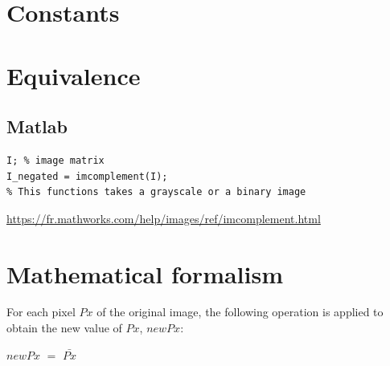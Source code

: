 \documentclass[12pt,a4paper]{article}
\begin{document}
\section*{Constants}




\section*{Equivalence}
\subsection*{Matlab}

\lstset{language=Matlab}
\begin{lstlisting}
I; % image matrix
I_negated = imcomplement(I);
% This functions takes a grayscale or a binary image

\end{lstlisting}

\url{https://fr.mathworks.com/help/images/ref/imcomplement.html}



\section*{Mathematical formalism}

For each pixel $Px$ of the original image, the following operation is applied to obtain the new value of $Px$, $newPx$:


\centering

$\displaystyle newPx $ 	$\textstyle =$ 	$\displaystyle \bar{Px}$

\vspace{0.5cm}
\end{document}
